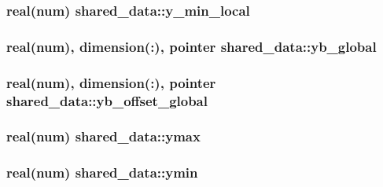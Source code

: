 \subsubsection[{\texorpdfstring{y\+\_\+min\+\_\+local}{y_min_local}}]{\setlength{\rightskip}{0pt plus 5cm}real(num) shared\+\_\+data\+::y\+\_\+min\+\_\+local}\hypertarget{namespaceshared__data_a3e7f4b2ead34c7eb9885b4b896127441}{}\label{namespaceshared__data_a3e7f4b2ead34c7eb9885b4b896127441}
\subsubsection[{\texorpdfstring{yb\+\_\+global}{yb_global}}]{\setlength{\rightskip}{0pt plus 5cm}real(num), dimension(\+:), pointer shared\+\_\+data\+::yb\+\_\+global}\hypertarget{namespaceshared__data_a5c47105c9e91eee415dcf5d99f2feffc}{}\label{namespaceshared__data_a5c47105c9e91eee415dcf5d99f2feffc}
\subsubsection[{\texorpdfstring{yb\+\_\+offset\+\_\+global}{yb_offset_global}}]{\setlength{\rightskip}{0pt plus 5cm}real(num), dimension(\+:), pointer shared\+\_\+data\+::yb\+\_\+offset\+\_\+global}\hypertarget{namespaceshared__data_a73076ccf0db0fc2938cfb670ead8e284}{}\label{namespaceshared__data_a73076ccf0db0fc2938cfb670ead8e284}
\subsubsection[{\texorpdfstring{ymax}{ymax}}]{\setlength{\rightskip}{0pt plus 5cm}real(num) shared\+\_\+data\+::ymax}\hypertarget{namespaceshared__data_abe75e74d4222157dbf64bb183266cd5d}{}\label{namespaceshared__data_abe75e74d4222157dbf64bb183266cd5d}
\subsubsection[{\texorpdfstring{ymin}{ymin}}]{\setlength{\rightskip}{0pt plus 5cm}real(num) shared\+\_\+data\+::ymin}\hypertarget{namespaceshared__data_a1a0991602b1e5feb2d937663c8e31927}{}\label{namespaceshared__data_a1a0991602b1e5feb2d937663c8e31927}
